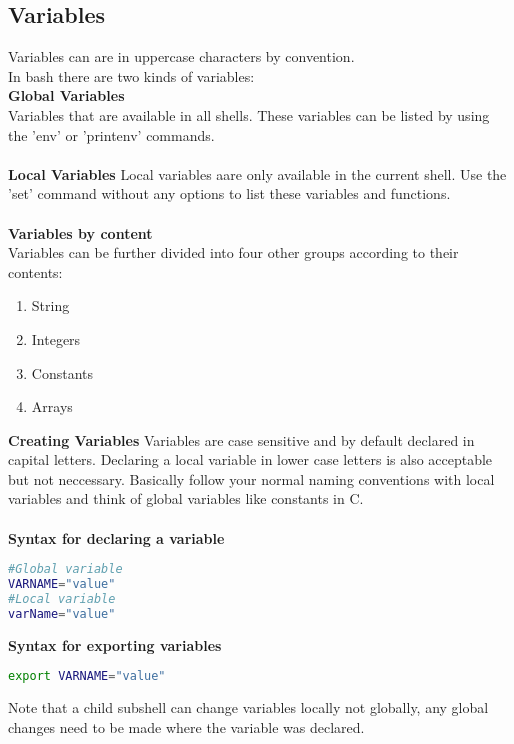 \documentclass[12pt, letterpaper]{report}
\begin{document}
\subsection{Variables}
Variables can are in uppercase characters by convention.\\
In bash there are two kinds of variables:\\

\textbf{Global Variables}\\
Variables that are available in all shells. These variables can be listed by 
using the 'env' or 'printenv' commands.\\\\

\textbf{Local Variables}
Local variables aare only available in the current shell. Use the 'set' command
 without any options to list these variables and functions.\\\\

 \textbf{Variables by content}\\
Variables can be further divided into four other groups according to their 
contents:
\begin{enumerate}
	\item String 
	\item Integers
	\item Constants
	\item Arrays
\end{enumerate}

\textbf{Creating Variables}
Variables are case sensitive and by default declared in capital letters. 
Declaring a local variable in lower case letters is also acceptable but not 
neccessary. Basically follow your normal naming conventions with local variables
and think of global variables like constants in C.\\\\

\textbf{Syntax for declaring a variable}\\
\begin{lstlisting}[language=Bash,framexleftmargin=5mm,frame=single,xleftmargin=18pt]
#Global variable
VARNAME="value"
#Local variable
varName="value"
\end{lstlisting}

\textbf{Syntax for exporting variables}\\
\begin{lstlisting}[language=Bash,framexleftmargin=5mm,frame=single,xleftmargin=18pt]
export VARNAME="value"
\end{lstlisting}
Note that a child subshell can change variables locally not globally, any global 
changes need to be made where the variable was declared.\\\\
\end{document}
